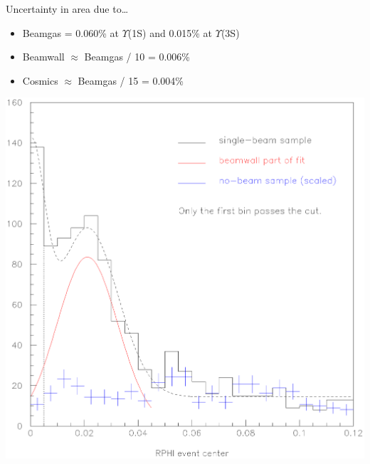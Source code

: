 
\begin{slide*}

\slideframe{}
\huge
{}

\begin{minipage}[t]{\linewidth}
\Large

Uncertainty in area due to\ldots

\begin{itemize}

  \item Beamgas = 0.060\% at $\Upsilon$(1S) and 0.015\% at $\Upsilon$(3S)

  \item Beamwall $\approx$ Beamgas / 10 = 0.006\%

  \item Cosmics $\approx$ Beamgas / 15 = 0.004\%

\end{itemize}

\vspace{-0.5cm}

\begin{center}
  \includegraphics[width=0.9\linewidth]{cosmics_vs_beamgas.eps}
\end{center}

\end{minipage}

\end{slide*}

